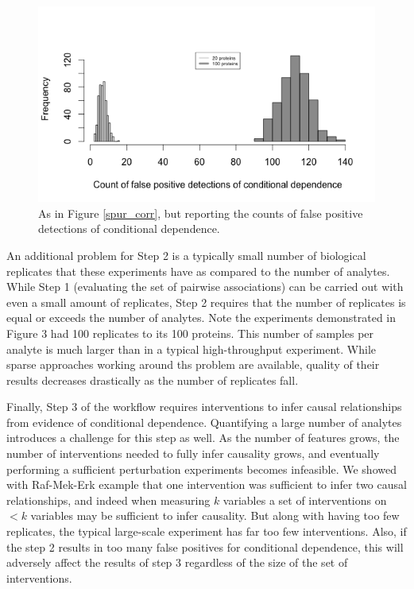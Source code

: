\documentclass[journal=jacsat,manuscript=article]{achemso}
\begin{document}
\begin{figure}[!tpb]
\centerline{\includegraphics[width=1\textwidth]{figs/spurious_dep.png}}
\caption{As in Figure \ref{spur_corr}, but reporting the counts of false positive detections of conditional dependence.}
\label{spur_dep}
\end{figure}

An additional problem for Step 2 is a typically small number of biological replicates that these experiments have as compared to the number of analytes. While Step 1 (evaluating the set of pairwise associations) can be carried out with even a small amount of replicates, Step 2 requires that the number of replicates is equal or exceeds the number of analytes.  Note the experiments demonstrated in Figure 3 had 100 replicates to its 100 proteins. This number of samples per analyte is much larger than in a typical high-throughput experiment.  While sparse approaches working around ths problem are available, quality of their results decreases drastically as the number of replicates fall.    

Finally, Step 3 of the workflow requires interventions to infer causal relationships from evidence of conditional dependence.  Quantifying a large number of analytes introduces a  challenge for this step as well. As the number of features grows, the number of interventions needed to fully infer causality grows, and eventually performing a sufficient perturbation experiments becomes infeasible.   We showed with Raf-Mek-Erk example that one intervention was sufficient to infer two causal relationships, and indeed when measuring $k$ variables a set of interventions on $< k$ variables may be sufficient to infer causality.  But along with having too few replicates, the typical large-scale experiment has far too few interventions.  Also, if the step 2 results in too many false positives for conditional dependence, this will adversely affect the results of step 3 regardless of the size of the set of interventions.
\end{document}
